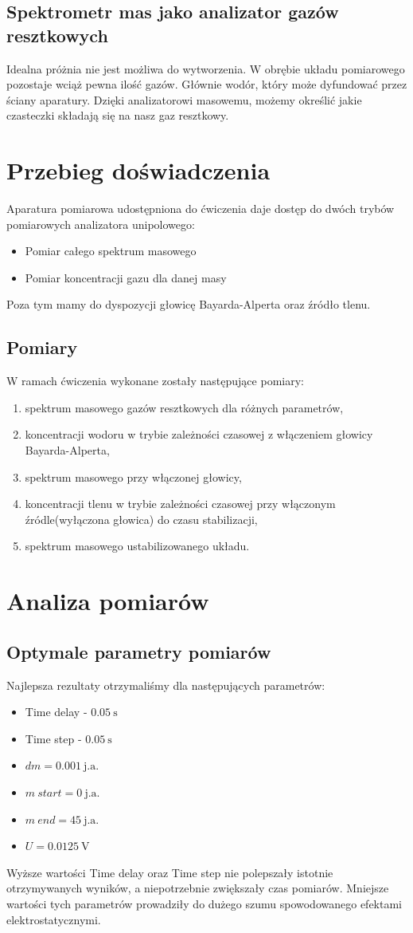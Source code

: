 \documentclass[paper=a4, fontsize=12pt]{scrartcl}
\begin{document}
\subsection{Spektrometr mas jako analizator gazów resztkowych}
Idealna próżnia nie jest możliwa do wytworzenia. W obrębie układu pomiarowego pozostaje wciąż pewna ilość gazów. Głównie wodór, który może dyfundować przez ściany aparatury. 
Dzięki analizatorowi masowemu, możemy określić jakie czasteczki składają się na nasz gaz resztkowy.
\section{Przebieg doświadczenia}
Aparatura pomiarowa udostępniona do ćwiczenia daje dostęp do dwóch trybów pomiarowych analizatora unipolowego:
\begin{itemize}
	\item Pomiar całego spektrum masowego
	\item Pomiar koncentracji gazu dla danej masy
\end{itemize}
Poza tym mamy do dyspozycji głowicę Bayarda-Alperta oraz źródło tlenu.
\subsection{Pomiary}
W ramach ćwiczenia wykonane zostały następujące pomiary:
\begin{enumerate}
	\item spektrum masowego gazów resztkowych dla różnych parametrów,
	\item koncentracji wodoru w trybie zależności czasowej z włączeniem głowicy Bayarda-Alperta,
	\item spektrum masowego przy włączonej głowicy,
	\item koncentracji tlenu w trybie zależności czasowej przy włączonym źródle(wyłączona głowica) do czasu stabilizacji,
	\item spektrum masowego ustabilizowanego układu.
\end{enumerate}
\clearpage
\section{Analiza pomiarów}
\subsection{Optymale parametry pomiarów}
Najlepsza rezultaty otrzymaliśmy dla następujących parametrów:
\begin{itemize}
	\item Time delay - $0.05\:\mathrm{s}$
	\item Time step - $0.05\:\mathrm{s}$
	\item $dm=0.001\:\mathrm{j.a.}$
	\item $m\:start=0\:\mathrm{j.a.}$
	\item $m\:end=45\:\mathrm{j.a.}$
	\item $U=0.0125\:\mathrm{V}$
\end{itemize}
Wyższe wartości Time delay oraz Time step nie polepszały istotnie otrzymywanych wyników, a niepotrzebnie zwiększały czas pomiarów. Mniejsze wartości tych parametrów prowadziły do dużego szumu spowodowanego efektami elektrostatycznymi.
\end{document}
